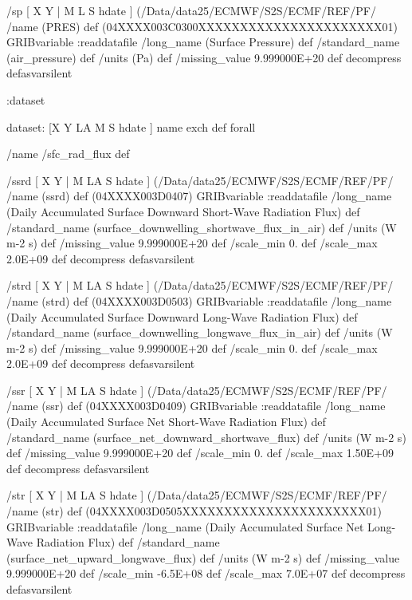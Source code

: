 \begin{ingrid}
{/sp { [ X Y | M L S hdate ] (/Data/data25/ECMWF/S2S/ECMF/REF/PF/%
/name (PRES) def
(04XXXX003C0300XXXXXXXXXXXXXXXXXXXXXX01) GRIBvariable
:readdatafile
/long_name (Surface Pressure) def
/standard_name (air_pressure) def
/units (Pa) def
/missing_value 9.999000E+20 def
decompress
} defasvarsilent

:dataset

dataset:
[X Y LA M S hdate ] {name exch def } forall

/name /sfc_rad_flux def

/ssrd { [ X Y | M LA S hdate ] (/Data/data25/ECMWF/S2S/ECMF/REF/PF/%
/name (ssrd) def
(04XXXX003D0407) GRIBvariable
:readdatafile
/long_name (Daily Accumulated Surface Downward Short-Wave Radiation Flux) def
/standard_name (surface_downwelling_shortwave_flux_in_air) def
/units (W m-2 s) def
/missing_value 9.999000E+20 def
/scale_min 0. def
/scale_max 2.0E+09 def
decompress
} defasvarsilent

/strd { [ X Y | M LA S hdate ] (/Data/data25/ECMWF/S2S/ECMF/REF/PF/%
/name (strd) def
(04XXXX003D0503) GRIBvariable
:readdatafile
/long_name (Daily Accumulated Surface Downward Long-Wave Radiation Flux) def
/standard_name (surface_downwelling_longwave_flux_in_air) def
/units (W m-2 s) def
/missing_value 9.999000E+20 def
/scale_min 0. def
/scale_max 2.0E+09 def
decompress
} defasvarsilent

/ssr { [ X Y | M LA S hdate ] (/Data/data25/ECMWF/S2S/ECMF/REF/PF/%
/name (ssr) def
(04XXXX003D0409) GRIBvariable
:readdatafile
/long_name (Daily Accumulated Surface Net Short-Wave Radiation Flux) def
/standard_name (surface_net_downward_shortwave_flux) def
/units (W m-2 s) def
/missing_value 9.999000E+20 def
/scale_min 0. def
/scale_max 1.50E+09 def
decompress
} defasvarsilent

/str { [ X Y | M LA S hdate ] (/Data/data25/ECMWF/S2S/ECMF/REF/PF/%
/name (str) def
(04XXXX003D0505XXXXXXXXXXXXXXXXXXXXXX01) GRIBvariable
:readdatafile
/long_name (Daily Accumulated Surface Net Long-Wave Radiation Flux) def
/standard_name (surface_net_upward_longwave_flux) def
/units (W m-2 s) def
/missing_value 9.999000E+20 def
/scale_min -6.5E+08 def
/scale_max 7.0E+07 def
decompress
} defasvarsilent

}
\end{ingrid}

